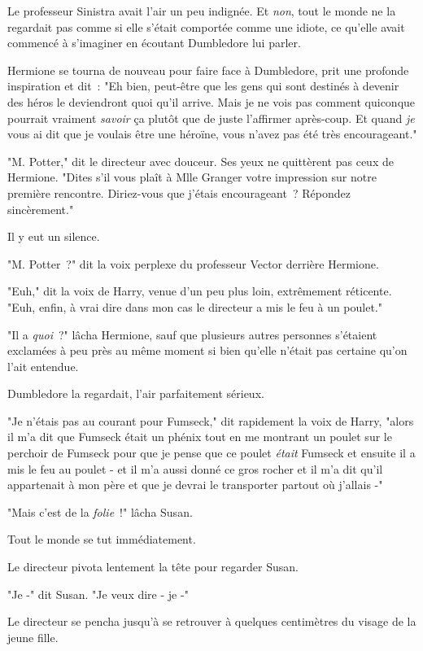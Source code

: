Le professeur Sinistra avait l'air un peu indignée. Et \emph{non}, tout le monde ne la regardait pas comme si elle s'était comportée comme une idiote, ce qu'elle avait commencé à s'imaginer en écoutant Dumbledore lui parler.

Hermione se tourna de nouveau pour faire face à Dumbledore, prit une profonde inspiration et dit~: "Eh bien, peut-être que les gens qui sont destinés à devenir des héros le deviendront quoi qu'il arrive. Mais je ne vois pas comment quiconque pourrait vraiment \emph{savoir} ça plutôt que de juste l'affirmer après-coup. Et quand \emph{je} vous ai dit que je voulais être une héroïne, vous n'avez pas été très encourageant."

"M. Potter," dit le directeur avec douceur. Ses yeux ne quittèrent pas ceux de Hermione. "Dites s'il vous plaît à Mlle Granger votre impression sur notre première rencontre. Diriez-vous que j'étais encourageant~? Répondez sincèrement."

Il y eut un silence.

"M. Potter~?" dit la voix perplexe du professeur Vector derrière Hermione.

"Euh," dit la voix de Harry, venue d'un peu plus loin, extrêmement réticente. "Euh, enfin, à vrai dire dans mon cas le directeur a mis le feu à un poulet."

"Il a \emph{quoi}~?" lâcha Hermione, sauf que plusieurs autres personnes s'étaient exclamées à peu près au même moment si bien qu'elle n'était pas certaine qu'on l'ait entendue.

Dumbledore la regardait, l'air parfaitement sérieux.

"Je n'étais pas au courant pour Fumseck," dit rapidement la voix de Harry, "alors il m'a dit que Fumseck était un phénix tout en me montrant un poulet sur le perchoir de Fumseck pour que je pense que ce poulet \emph{était} Fumseck et ensuite il a mis le feu au poulet - et il m'a aussi donné ce gros rocher et il m'a dit qu'il appartenait à mon père et que je devrai le transporter partout où j'allais -"

"Mais c'est de la \emph{folie}~!" lâcha Susan.

Tout le monde se tut immédiatement.

Le directeur pivota lentement la tête pour regarder Susan.

"Je -" dit Susan. "Je veux dire - je -"

Le directeur se pencha jusqu'à se retrouver à quelques centimètres du visage de la jeune fille.


